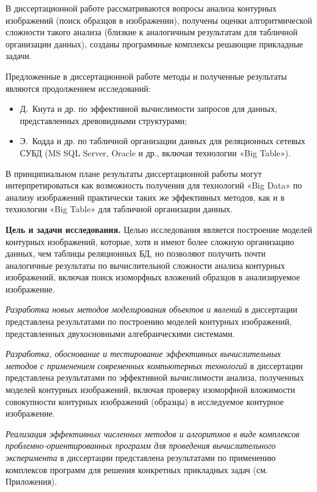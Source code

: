 В диссертационной работе рассматриваются вопросы анализа контурных изображений (поиск образцов в изображении), получены оценки алгоритмической сложности такого анализа (близкие к аналогичным результатам для табличной организации данных), созданы программные комплексы решающие прикладные задачи.

Предложенные в  диссертационной работе методы и полученные результаты являются продолжением исследований: 
\begin{itemize}
\item Д.~Кнута и др. по эффективной вычислимости запросов для данных, представленных древовидными структурами;
\item Э.~Кодда и др. по табличной организации данных для реляционных сетевых СУБД (MS SQL Server, Oracle и др., включая технологии «Big Table»).
\end{itemize}

В принципиальном плане результаты диссертационной работы могут интерпретироваться как возможность получения для технологий «Big Data» по анализу изображений практически таких же эффективных методов, как и в   технологии  «Big Table» для табличной организации данных.


\textbf{Цель и задачи  исследования.} Целью  исследования является построение  моделей контурных изображений, которые, хотя и имеют более сложную организацию данных, чем  таблицы реляционных БД, но позволяют получить почти аналогичные результаты по вычислительной сложности  анализа контурных изображений, включая поиск изоморфных вложений образцов в анализируемое изображение.

\textit{Разработка новых  методов моделирования объектов и явлений}  в диссертации представлена результатами по построению  моделей контурных изображений, представленных двухосновными алгебраическими системами.

\textit{Разработка, обоснование и тестирование эффективных вычислительных методов с применением современных компьютерных технологий} в диссертации представлена результатами по эффективной вычислимости анализа, полученных  моделей контурных изображений, включая проверку изоморфной вложимости совокупности контурных изображений (образцы) в исследуемое контурное изображение.

\textit{Реализация эффективных численных методов и алгоритмов в виде комплексов проблемно-ориентированных программ для проведения вычислительного эксперимента} в диссертации представлена результатами по применению комплексов программ для решения конкретных прикладных задач  (см. Приложения).

